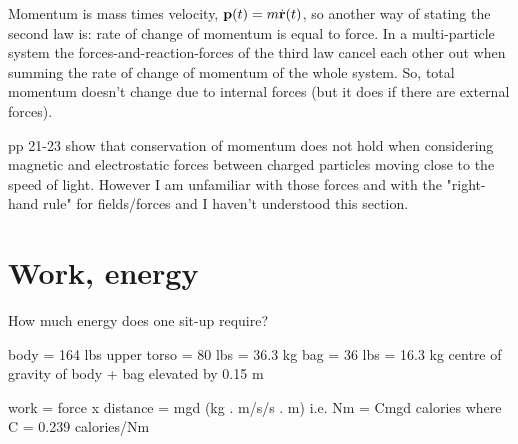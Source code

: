 Momentum is mass times velocity, $\mathbf{p}(t) = m\dot {\mathbf{r}}(t)$, so another way of
stating the second law is: rate of change of momentum is equal to force. In a
multi-particle system the forces-and-reaction-forces of the third law cancel
each other out when summing the rate of change of momentum of the whole
system. So, total momentum doesn't change due to internal forces (but it does
if there are external forces).

pp 21-23 show that conservation of momentum does not hold when considering
magnetic and electrostatic forces between charged particles moving close to the
speed of light. However I am unfamiliar with those forces and with the
"right-hand rule" for fields/forces and I haven't understood this section.

\section{Work, energy}

How much energy does one sit-up require?

body = 164 lbs
upper torso = 80 lbs = 36.3 kg
bag = 36 lbs = 16.3 kg
centre of gravity of body + bag elevated by 0.15 m

work = force x distance
     = mgd (kg . m/s/s . m) i.e. Nm
     = Cmgd calories where C = 0.239 calories/Nm
